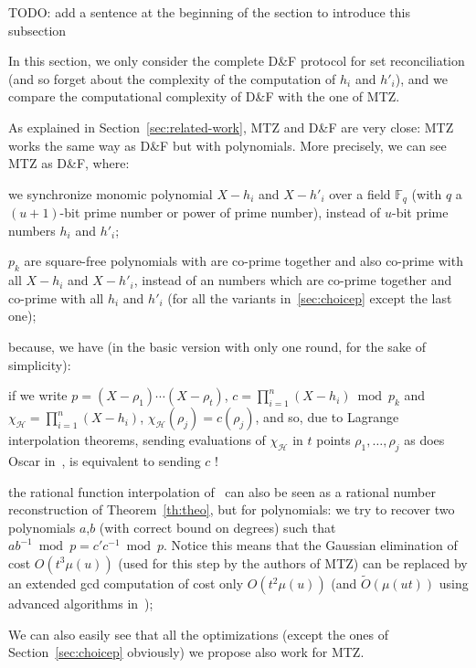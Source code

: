 \documentclass[twoside,envcountsame,runningheads]{llncs}
\newcommand{\Oapp}{\ensuremath{\tilde{O}}}
\newcommand{\Set}{\mathcal{H}}
\newcommand{\df}{D\&F\xspace}
\begin{document}
TODO: add a sentence at the beginning of the section to introduce this subsection


In this section, we only consider the complete \df protocol for set reconciliation (and so forget about the complexity of the computation of $h_i$ and $h'_i$), and we compare the computational complexity of \df with the one of MTZ.

As explained in Section~\ref{sec:related-work}, MTZ and \df are very close:
MTZ works the same way as \df but with polynomials.
More precisely, we can see MTZ as \df, where:
\begin{compactitem}
\item we synchronize monomic polynomial $X-h_i$ and $X-h'_i$ over a field $\mathbb{F}_q$ (with $q$ a $(u+1)$-bit prime number or power of prime number), instead of $u$-bit prime numbers $h_i$ and $h'_i$;
\item $p_k$ are square-free polynomials with are co-prime together and also co-prime with all $X-h_i$ and $X-h'_i$, instead of an numbers which are co-prime together and co-prime with all $h_i$ and $h'_i$ (for all the variants in~\ref{sec:choicep} except the last one);
\end{compactitem}
because, we have (in the basic version with only one round, for the sake of simplicity):
\begin{compactitem}
\item if we write $p = (X-\rho_1) \cdots (X-\rho_t)$, $c = \prod_{i=1}^n (X-h_i) \bmod p_k$ and $\chi_\Set = \prod_{i=1}^n (X-h_i)$, $\chi_\Set(\rho_j) = c(\rho_j)$, and so, due to Lagrange interpolation theorems, sending evaluations of $\chi_\Set$ in $t$ points $\rho_1,\dots,\rho_j$ as does Oscar in~\cite{Mins1}, is equivalent to sending $c$ !
\item the rational function interpolation of~\cite{Mins1} can also be seen as a rational number reconstruction of Theorem~\ref{th:theo}, but for polynomials: we try to recover two polynomials $a$,$b$ (with correct bound on degrees) such that $a b^{-1} \bmod p = c' c^{-1} \bmod p$.
Notice this means that the Gaussian elimination of cost $O(t^3 \mu(u))$ (used for this step by the authors of MTZ) can be replaced by an extended gcd computation of cost only $O(t^2 \mu(u))$ (and $\Oapp(\mu(ut))$ using advanced algorithms in~\cite{pan2004rational,wang2003acceleration});
\end{compactitem}
We can also easily see that all the optimizations (except the ones of Section~\ref{sec:choicep} obviously) we propose also work for MTZ.
\end{document}
